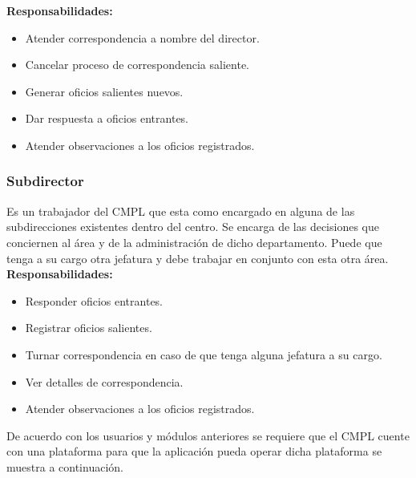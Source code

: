 \textbf{Responsabilidades:}
\begin{itemize}
	\item Atender correspondencia a nombre del director.
	\item Cancelar proceso de correspondencia saliente.
	\item Generar oficios salientes nuevos.
	\item Dar respuesta a oficios entrantes.
	\item Atender observaciones a los oficios registrados.
\end{itemize}

\subsubsection{Subdirector}
Es un trabajador del CMPL que esta como encargado en alguna de las subdirecciones existentes dentro del centro. Se encarga de las decisiones que conciernen al área y de la administración de dicho departamento. Puede que tenga a su cargo otra jefatura y debe trabajar en conjunto con esta otra área.\\ 

\textbf{Responsabilidades:}
\begin{itemize}
	\item Responder oficios entrantes.
	\item Registrar oficios salientes.
	\item Turnar correspondencia en caso de que tenga alguna jefatura a su cargo.
	\item Ver detalles de correspondencia.
	\item Atender observaciones a los oficios registrados.
\end{itemize}

De acuerdo con los usuarios y módulos anteriores se requiere que el CMPL cuente con una plataforma para que la aplicación pueda operar dicha plataforma se muestra a continuación.


